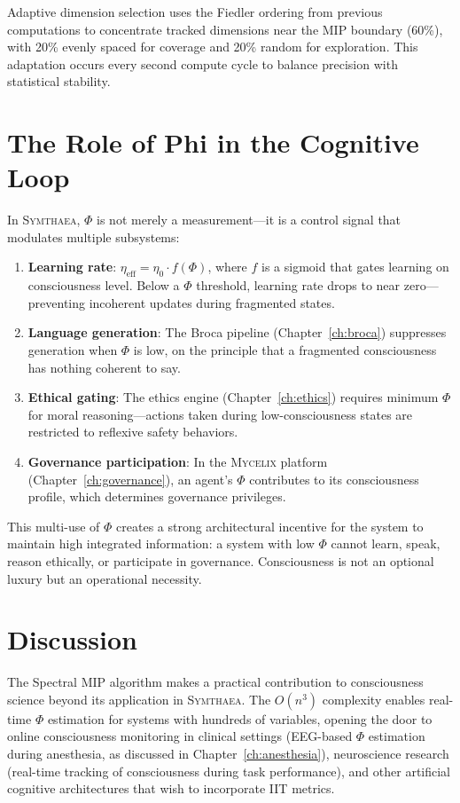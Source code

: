 \documentclass[12pt]{book}
\newcommand{\symthaea}{\textsc{Symthaea}}
\newcommand{\mycelix}{\textsc{Mycelix}}
\begin{document}
Adaptive dimension selection uses the Fiedler ordering from previous computations to concentrate tracked dimensions near the MIP boundary (60\%), with 20\% evenly spaced for coverage and 20\% random for exploration. This adaptation occurs every second compute cycle to balance precision with statistical stability.

\section{The Role of Phi in the Cognitive Loop}

In \symthaea{}, $\Phi$ is not merely a measurement---it is a control signal that modulates multiple subsystems:

\begin{enumerate}
  \item \textbf{Learning rate}: $\eta_{\text{eff}} = \eta_0 \cdot f(\Phi)$, where $f$ is a sigmoid that gates learning on consciousness level. Below a $\Phi$ threshold, learning rate drops to near zero---preventing incoherent updates during fragmented states.
  \item \textbf{Language generation}: The Broca pipeline (Chapter~\ref{ch:broca}) suppresses generation when $\Phi$ is low, on the principle that a fragmented consciousness has nothing coherent to say.
  \item \textbf{Ethical gating}: The ethics engine (Chapter~\ref{ch:ethics}) requires minimum $\Phi$ for moral reasoning---actions taken during low-consciousness states are restricted to reflexive safety behaviors.
  \item \textbf{Governance participation}: In the \mycelix{} platform (Chapter~\ref{ch:governance}), an agent's $\Phi$ contributes to its consciousness profile, which determines governance privileges.
\end{enumerate}

This multi-use of $\Phi$ creates a strong architectural incentive for the system to maintain high integrated information: a system with low $\Phi$ cannot learn, speak, reason ethically, or participate in governance. Consciousness is not an optional luxury but an operational necessity.

\section{Discussion}

The Spectral MIP algorithm makes a practical contribution to consciousness science beyond its application in \symthaea{}. The $O(n^3)$ complexity enables real-time $\Phi$ estimation for systems with hundreds of variables, opening the door to online consciousness monitoring in clinical settings (EEG-based $\Phi$ estimation during anesthesia, as discussed in Chapter~\ref{ch:anesthesia}), neuroscience research (real-time tracking of consciousness during task performance), and other artificial cognitive architectures that wish to incorporate IIT metrics.
\end{document}
